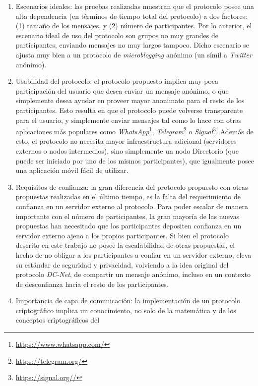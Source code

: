 \begin{enumerate}
    \item Escenarios ideales: las pruebas realizadas muestran que el protocolo posee una 
    alta dependencia (en términos de tiempo total del protocolo) a dos factores: 
    (1) tamaño de los mensajes, y (2) número de participantes. Por lo anterior, el escenario 
    ideal de uso del protocolo son grupos no muy grandes de participantes, enviando mensajes 
    no muy largos tampoco. Dicho escenario se ajusta muy bien a un protocolo de 
    \emph{microblogging} anónimo (un símil a \emph{Twitter} anónimo).
    \item Usabilidad del protocolo: el protocolo propuesto implica muy poca participación 
    del usuario que desea enviar un mensaje anónimo, o que simplemente desea ayudar en proveer 
    mayor anonimato para el resto de los participantes. Esto resulta en que el protocolo 
    puede volverse transparente para el usuario, y simplemente enviar mensajes tal como lo hace 
    con otras aplicaciones más populares como 
    \emph{WhatsApp}\footnote{\url{https://www.whatsapp.com/}}, 
    \emph{Telegram}\footnote{\url{https://telegram.org/}} o \emph{Signal}\footnote{\url{https://signal.org//}}. 
    Además de esto, el protocolo no necesita mayor infraestructura adicional (servidores externos o 
    nodos intermedios), sino 
    simplemente un nodo Directorio (que puede ser iniciado por uno de los mismos participantes), 
    que igualmente posee una aplicación móvil fácil de utilizar.
    \item Requisitos de confianza: la gran diferencia del protocolo propuesto con 
    otras propuestas realizadas en el último tiempo, es la falta del requerimiento de 
    confianza en un servidor externo al protocolo. Para poder escalar de manera importante 
    con el número de participantes, la gran mayoría de las nuevas propuestas han necesitado 
    que los participantes depositen confianza en un servidor externo ajeno a los propios 
    participantes. Si bien el protocolo descrito en este trabajo no posee la escalabilidad 
    de otras propuestas, el hecho de no obligar a los participantes a confiar en un servidor 
    externo, eleva su estándar de seguridad y privacidad, volviendo a la idea original del 
    protocolo \emph{DC-Net}, de compartir un mensaje anónimo, incluso en un contexto de 
    desconfianza hacia el resto de los participantes. 
    \item Importancia de capa de comunicación: la implementación de un protocolo criptográfico 
    implica un conocimiento, no solo de la matemática y de los conceptos criptográficos del 

\end{enumerate}

